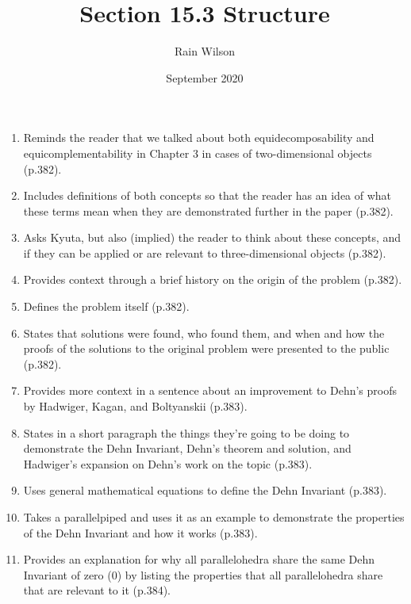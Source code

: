 \documentclass{article}
\title{Section 15.3 Structure}
\author{Rain Wilson}
\date{September 2020}
\begin{document}
\maketitle

\begin{enumerate}

    \item Reminds the reader that we talked about both equidecomposability and equicomplementability in Chapter 3 in cases of two-dimensional objects (p.382).
    
    \item Includes definitions of both concepts so that the reader has an idea of what these terms mean when they are demonstrated further in the paper (p.382).
    
    \item Asks Kyuta, but also (implied) the reader to think about these concepts, and if they can be applied or are relevant to three-dimensional objects (p.382).
    
    \item Provides context through a brief history on the origin of the problem (p.382).
    
    \item Defines the problem itself (p.382).
    
    \item States that solutions were found, who found them, and when and how the proofs of the solutions to the original problem were presented to the public (p.382).
    
    \item Provides more context in a sentence about an improvement to Dehn's proofs by Hadwiger, Kagan, and Boltyanskii (p.383).
    
    \item States in a short paragraph the things they're going to be doing to demonstrate the Dehn Invariant, Dehn's theorem and solution, and Hadwiger's expansion on Dehn's work on the topic (p.383).
    
    \item Uses general mathematical equations to define the Dehn Invariant (p.383).
    
    \item Takes a parallelpiped and uses it as an example to demonstrate the properties of the Dehn Invariant and how it works (p.383).
    
    \item Provides an explanation for why all parallelohedra share the same Dehn Invariant of zero (0) by listing the properties that all parallelohedra share that are relevant to it (p.384).
    

\end{enumerate}
\end{document}
